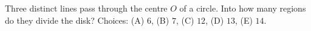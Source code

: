 Three distinct lines pass through the centre $ O $ of a circle. Into how many regions do they divide the disk? Choices: (A) $ 6 $, (B) $ 7 $, (C) $ 12 $, (D) $ 13 $, (E) $ 14 $.
